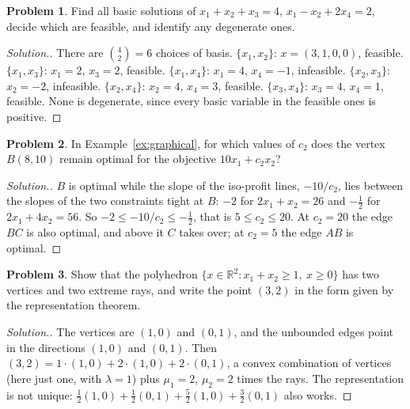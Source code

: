 \documentclass[11pt,a4paper]{article}
\numberwithin{equation}{section}
\theoremstyle{definition}
\newtheorem{problemx}{Problem}[subsection]
\newenvironment{problem}{\begin{problemx}}{\end{problemx}}
\newenvironment{solution}
  {\renewcommand{\qedsymbol}{}\begin{proof}[\textit{Solution}.]}
  {\end{proof}}
\begin{document}
\begin{problem}
Find all basic solutions of $x_1 + x_2 + x_3 = 4$, $x_1 - x_2 + 2x_4 = 2$, decide which are feasible, and identify any degenerate ones.
\end{problem}

\begin{solution}
There are $\binom42 = 6$ choices of basis. $\{x_1, x_2\}$: $x = (3, 1, 0, 0)$, feasible. $\{x_1, x_3\}$: $x_1 = 2$, $x_3 = 2$, feasible. $\{x_1, x_4\}$: $x_1 = 4$, $x_4 = -1$, infeasible. $\{x_2, x_3\}$: $x_2 = -2$, infeasible. $\{x_2, x_4\}$: $x_2 = 4$, $x_4 = 3$, feasible. $\{x_3, x_4\}$: $x_3 = 4$, $x_4 = 1$,
feasible. None is degenerate, since every basic variable in the feasible ones is positive.
\end{solution}

\begin{problem}
In Example~\ref{ex:graphical}, for which values of $c_2$ does the vertex $B(8, 10)$ remain optimal for the objective $10x_1 + c_2x_2$?
\end{problem}

\begin{solution}
$B$ is optimal while the slope of the iso-profit lines, $-10/c_2$, lies between the slopes of the two constraints tight at $B$: $-2$ for $2x_1 + x_2 = 26$ and $-\frac12$ for $2x_1 + 4x_2 = 56$. So $-2 \leq -10/c_2 \leq -\frac12$, that is $5 \leq c_2 \leq 20$. At $c_2 = 20$ the edge $BC$ is also optimal, and above it $C$ takes over;
at $c_2 = 5$ the edge $AB$ is optimal.
\end{solution}

\begin{problem}
Show that the polyhedron $\{x \in \mathbb R^2 : x_1 + x_2 \geq 1,\ x \geq 0\}$ has two vertices and two extreme rays, and write the point $(3, 2)$ in the form given by the representation theorem.
\end{problem}

\begin{solution}
The vertices are $(1, 0)$ and $(0, 1)$, and the unbounded edges point in the directions $(1, 0)$ and $(0, 1)$. Then $(3, 2) = 1\cdot(1, 0) + 2\cdot(1, 0) + 2\cdot(0, 1)$, a convex combination of vertices (here just one, with $\lambda = 1$) plus $\mu_1 = 2$, $\mu_2 = 2$ times the rays. The representation is not
unique: $\frac12(1, 0) + \frac12(0, 1) + \frac52(1, 0) + \frac32(0, 1)$ also works.
\end{solution}

\end{document}

